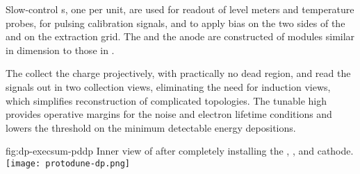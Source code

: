 Slow-control \fdth{}s, one per  unit, are used for readout of level meters and temperature probes,   for pulsing calibration signals, and to apply  bias on the two sides of the  and on the extraction grid. The  and the anode are constructed of modules similar in dimension to those in .


The  collect the charge projectively,  with practically no dead region, and read the signals out  in two collection views, eliminating the need for  induction views,  which  simplifies reconstruction of complicated topologies. The tunable high  provides operative margins for the noise and electron lifetime conditions and lowers the threshold on the minimum detectable energy depositions.


\begin{dunefigure}{fig:dp-execsum-pddp}
  {Inner view of  after completely installing the , , and cathode.}
  \texttt{[image: protodune-dp.png]}
\end{dunefigure}



